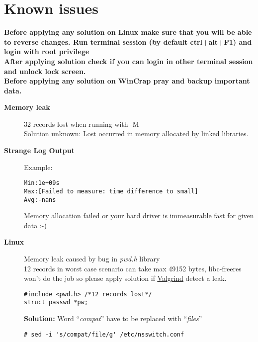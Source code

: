 \hypertarget{KnownIssues}{
\section{Known issues}
\label{KnownIssues}
}

{\bf 
Before applying any solution on Linux make sure that you will be able to reverse changes.
Run terminal session (by default ctrl+alt+F1) and login with root privilege\\[12pt]
After applying solution check if you can login in other terminal session and unlock lock screen.\\[12pt]
}
{\bf 
Before applying any solution on WinCrap pray and backup important data.
}

\begin{description}
\item [\bf{Memory leak}] 32 records lost when running with -M\\ Solution unknown: Lost occurred in memory allocated by linked libraries.
\item [\bf{Strange Log Output}] Example: \begin{verbatim}
Min:1e+09s
Max:[Failed to measure: time difference to small]
Avg:-nans
\end{verbatim} Memory allocation failed or your hard driver is immeasurable fast for given data :-)

\item [{\bf Linux}] Memory leak caused by bug in {\itshape pwd.h} library\\
12 records in worst case scenario can take max 49152 bytes, libc-freeres won't do the job so please apply solution if \href{http://valgrind.org/}{\underline{Valgrind}}  detect a leak.
\begin{verbatim}
#include <pwd.h> /*12 records lost*/
struct passwd *pw;
\end{verbatim}
{\bf Solution:} Word ``{\itshape compat}'' have to be replaced with ``{\itshape files}''
\begin{verbatim}
# sed -i 's/compat/file/g' /etc/nsswitch.conf
\end{verbatim}

\end{description}